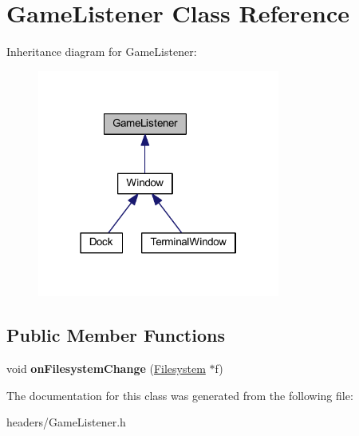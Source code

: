 \hypertarget{class_game_listener}{}\section{Game\+Listener Class Reference}
\label{class_game_listener}


Inheritance diagram for Game\+Listener\+:\nopagebreak
\begin{figure}[H]
\begin{center}
\leavevmode
\includegraphics[width=226pt]{class_game_listener__inherit__graph}
\end{center}
\end{figure}
\subsection*{Public Member Functions}
\begin{DoxyCompactItemize}
\item 
\hypertarget{class_game_listener_a567361920fc494b68fda9d08b3222e1b}{}\label{class_game_listener_a567361920fc494b68fda9d08b3222e1b} 
void {\bfseries on\+Filesystem\+Change} (\hyperlink{class_filesystem}{Filesystem} $\ast$f)
\end{DoxyCompactItemize}


The documentation for this class was generated from the following file\+:\begin{DoxyCompactItemize}
\item 
headers/Game\+Listener.\+h\end{DoxyCompactItemize}
